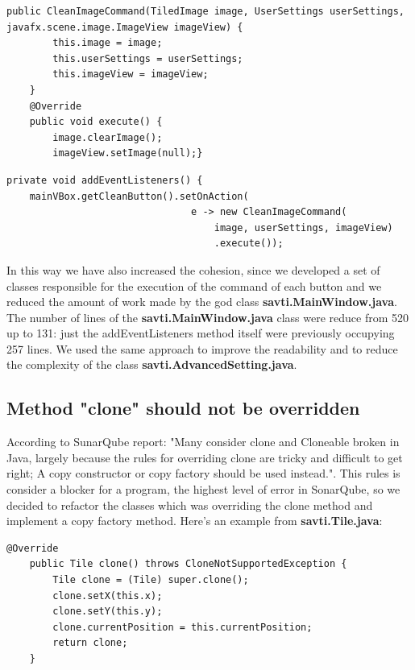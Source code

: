 \documentclass{article}
\begin{document}
\begin{lstlisting}[caption={Command},captionpos=b]
public CleanImageCommand(TiledImage image, UserSettings userSettings, javafx.scene.image.ImageView imageView) {
        this.image = image;
        this.userSettings = userSettings;
        this.imageView = imageView;
    }
    @Override
    public void execute() {
        image.clearImage();
        imageView.setImage(null);}
\end{lstlisting}


\begin{lstlisting}[caption={Client},captionpos =b]
 private void addEventListeners() {
    mainVBox.getCleanButton().setOnAction(
                                e -> new CleanImageCommand(
                                    image, userSettings, imageView)
                                    .execute());
\end{lstlisting}
In this way we have also increased the cohesion, since we developed a set of classes responsible for the execution of the command of each button and we reduced the amount of work made by the god class \textbf{savti.MainWindow.java}.
The number of lines of the \textbf{savti.MainWindow.java} class were reduce from 520 up to 131: just the addEventListeners method itself were previously occupying 257 lines.
We used the same approach to improve the readability and to reduce the complexity of the class \textbf{savti.AdvancedSetting.java}.
\\

\subsection{Method "clone" should not be overridden}
According to SunarQube report: "Many consider clone and Cloneable broken in Java, largely because the rules for overriding clone are tricky and difficult to get right; A copy constructor or copy factory should be used instead.". This rules is consider a blocker for a program, the highest level of error in SonarQube, so we decided to refactor the classes which was overriding the clone method and implement a copy factory method. Here's an example from \textbf{savti.Tile.java}:

    \begin{lstlisting}[caption={First clone implementation},captionpos =b]
    @Override
    public Tile clone() throws CloneNotSupportedException {
        Tile clone = (Tile) super.clone();
        clone.setX(this.x);
        clone.setY(this.y);
        clone.currentPosition = this.currentPosition;
        return clone;
    }
    \end{lstlisting}
    
\end{document}
